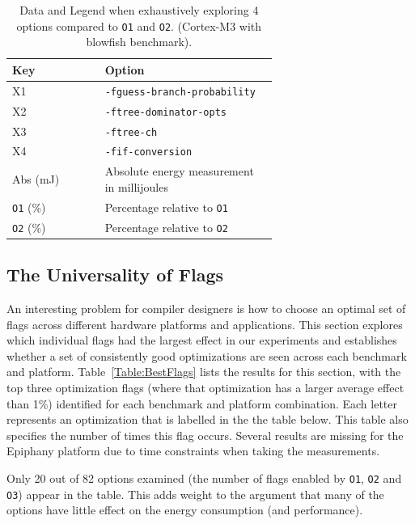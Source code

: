 \documentclass[twocolumn]{article}
\let\oldcaption\caption
\renewcommand{\caption}[1]{\oldcaption{\textup{#1}}}
\begin{document}
\begin{table}[tb]
	\begin{tabular}{l p{0.65\linewidth}}
		\bfseries Key & \bfseries Option \\
		\hline
		X1 & \texttt{-fguess-branch-probability}  \\
		X2 & \texttt{-ftree-dominator-opts}  \\
		X3 & \texttt{-ftree-ch} \\
		X4 & \texttt{-fif-conversion} \\
		Abs (mJ) & Absolute energy measurement in millijoules \\
		\texttt{O1} (\%) & Percentage relative to \texttt{O1} \\
		\texttt{O2} (\%) & Percentage relative to \texttt{O2} \\
	\end{tabular}
	\caption{Data and Legend when exhaustively exploring 4 options compared to \texttt{O1} and \texttt{O2}. (Cortex-M3 with blowfish benchmark).}
	\label{Table:Exhaustive}
\end{table}





\subsection{The Universality of Flags}

An interesting problem for compiler designers is how to choose an optimal set of flags across different hardware platforms and applications. This section explores which individual flags had the largest effect in our experiments and establishes whether a set of consistently good optimizations are seen across each benchmark and platform. Table~\ref{Table:BestFlags} lists the results for this section, with the top three optimization flags (where that optimization has a larger average effect than 1\%) identified for each benchmark and platform combination.  Each letter represents an optimization that is labelled in the the table below. This table also specifies the number of times this flag occurs. Several results are missing for the Epiphany platform due to time constraints when taking the measurements.

Only 20 out of 82 options examined (the number of flags enabled by \texttt{O1}, \texttt{O2} and \texttt{O3}) appear in the table. This adds weight to the argument that many of the options have little effect on the energy consumption (and performance).
\end{document}
